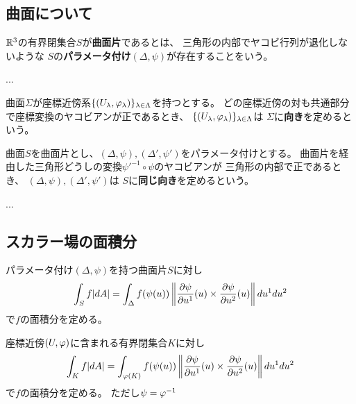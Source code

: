 \documentclass[report]{jlreq}
\begin{document}
\subsection{曲面について}

\begin{definition}[曲面片]
    $\mathbb{R}^3$の有界閉集合$S$が\textbf{曲面片}であるとは、
    三角形の内部でヤコビ行列が退化しないような
    $S$の\textbf{パラメータ付け}$(\Delta, \psi)$が存在することをいう。
\end{definition}

\begin{definition}[座標近傍]
    ...
\end{definition}

\begin{definition}
    曲面$\Sigma$が座標近傍系$\{(U_\lambda, \varphi_\lambda)\}_{\lambda \in \Lambda}$を持つとする。
    どの座標近傍の対も共通部分で座標変換のヤコビアンが正であるとき、
    $\{(U_\lambda, \varphi_\lambda)\}_{\lambda \in \Lambda}$は
    $\Sigma$に\textbf{向き}を定めるという。
\end{definition}

\begin{definition}
    曲面$S$を曲面片とし、$(\Delta, \psi), (\Delta', \psi')$をパラメータ付けとする。
    曲面片を経由した三角形どうしの変換$\psi'^{-1} \circ \psi$のヤコビアンが
    三角形の内部で正であるとき、
    $(\Delta, \psi), (\Delta', \psi')$は
    $S$に\textbf{同じ向き}を定めるという。
\end{definition}

\begin{definition}[境界の向き]
    ...
\end{definition}


\subsection{スカラー場の面積分}

\begin{definition}
    パラメータ付け$(\Delta, \psi)$を持つ曲面片$S$に対し
    \begin{equation}
        \int_S f |dA| = \int_{\Delta} f(\psi(u))
            \left\| \deldel[\psi]{u^1} (u) \times \deldel[\psi]{u^2} (u) \right\| du^1 du^2 
    \end{equation}
    で$f$の面積分を定める。
\end{definition}

\begin{definition}
    座標近傍$(U, \varphi)$に含まれる有界閉集合$K$に対し
    \begin{equation}
        \int_K f |dA| = \int_{\phai(K)} f(\psi(u))
            \left\| \deldel[\psi]{u^1} (u) \times \deldel[\psi]{u^2} (u) \right\| du^1 du^2 
    \end{equation}
    で$f$の面積分を定める。
    ただし$\psi = \varphi^{-1}$
\end{definition}
\end{document}
